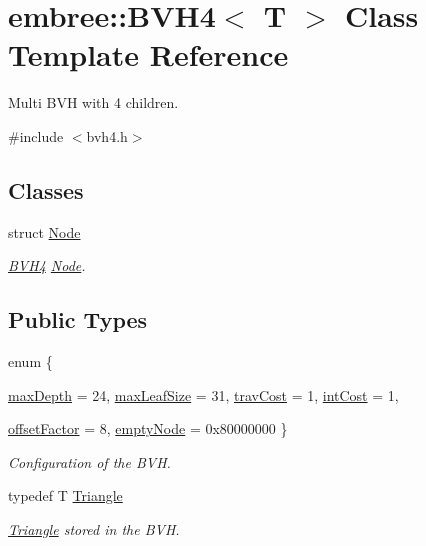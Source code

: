\hypertarget{classembree_1_1_b_v_h4}{
\section{embree::BVH4$<$ T $>$ Class Template Reference}
\label{classembree_1_1_b_v_h4}
}


Multi BVH with 4 children.  




{\ttfamily \#include $<$bvh4.h$>$}

\subsection*{Classes}
\begin{DoxyCompactItemize}
\item 
struct \hyperlink{structembree_1_1_b_v_h4_1_1_node}{Node}
\begin{DoxyCompactList}\small\item\em \hyperlink{classembree_1_1_b_v_h4}{BVH4} \hyperlink{structembree_1_1_b_v_h4_1_1_node}{Node}. \item\end{DoxyCompactList}\end{DoxyCompactItemize}
\subsection*{Public Types}
\begin{DoxyCompactItemize}
\item 
enum \{ \par
\hyperlink{classembree_1_1_b_v_h4_add8136d5156500f52137f7e347e874bba1568a398c05b380fa769fedf230a242f}{maxDepth} =  24, 
\hyperlink{classembree_1_1_b_v_h4_add8136d5156500f52137f7e347e874bba5ea83bcc72e6bcfde0e4935dcafd23d0}{maxLeafSize} =  31, 
\hyperlink{classembree_1_1_b_v_h4_add8136d5156500f52137f7e347e874bba17534645e1e1864d3f0f63cf33bf4a70}{travCost} =  1, 
\hyperlink{classembree_1_1_b_v_h4_add8136d5156500f52137f7e347e874bba38049eb2b9a7d1e380280e93e48117bb}{intCost} =  1, 
\par
\hyperlink{classembree_1_1_b_v_h4_add8136d5156500f52137f7e347e874bba18f81c5a45bf38a4639a2cb27bd20760}{offsetFactor} =  8, 
\hyperlink{classembree_1_1_b_v_h4_add8136d5156500f52137f7e347e874bba5f83b1c017ab18d5f49538e61005c6cf}{emptyNode} =  0x80000000
 \}
\begin{DoxyCompactList}\small\item\em Configuration of the BVH. \item\end{DoxyCompactList}\item 
typedef T \hyperlink{classembree_1_1_b_v_h4_a8967105dba389a8f0dc85ee53eee7345}{Triangle}
\begin{DoxyCompactList}\small\item\em \hyperlink{classembree_1_1_triangle}{Triangle} stored in the BVH. \item\end{DoxyCompactList}\end{DoxyCompactItemize}
